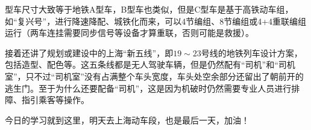 \documentclass[12pt, oneside, a4paper]{ctexart}
\begin{document}
\newpage
\journalpage\par\noindent
型车尺寸大致等于地铁A型车，B型车也类似，但是C型车是基于高铁动车组，如“复兴号”，进行降速降配、城铁化而来，可以4节编组、8节编组或4+4重联编组运行（两车连挂需要同步信号等设备才算重联，否则可能是救援）。\par{}
接着还讲了规划或建设中的上海“新五线”，即$19\sim23$号线的地铁列车设计方案，包括造型、配色等。这五条线都是无人驾驶车辆，但是仍然配有“司机”和“司机室”，只不过“司机室”没有占满整个车头宽度，车头处空余部分还留出了朝前开的逃生门。至于为什么还要配备“司机”，这是因为机破时仍然需要专业人员进行排障、指引乘客等操作。\par{}
今日的学习就到这里，明天去上海动车段，也是最后一天，加油！\par{}

\newpage
\journalpage
\vspace{-7.5mm}
\hypertarget{journal-day-0716}{}
\end{document}
